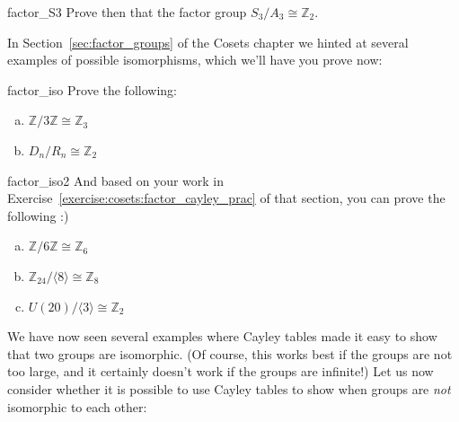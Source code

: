 
\begin{exercise}{factor_S3}
Prove then that the factor group $S_3/A_3 \cong {\mathbb Z}_2$.
\end{exercise}

In Section~\ref{sec:factor_groups} of the Cosets chapter we hinted at several examples of possible isomorphisms,  which we'll have you prove now:

\begin{exercise}{factor_iso}
Prove the following:
\begin{enumerate}[(a)]
\item
 ${\mathbb Z}/ 3 {\mathbb Z} \cong {\mathbb Z}_3$
\item
$D_n / R_n \cong {\mathbb Z}_2$
\end{enumerate}
\end{exercise}

\begin{exercise}{factor_iso2}
And based on your work in Exercise~\ref{exercise:cosets:factor_cayley_prac} of that section, you can prove the following :)
\begin{enumerate}[(a)]
\item
 ${\mathbb Z}/ 6 {\mathbb Z} \cong {\mathbb Z}_6 $

\item
 ${\mathbb Z}_{24} / \langle 8 \rangle \cong {\mathbb Z}_8 $ 

\item
$U(20) / \langle 3 \rangle \cong  {\mathbb Z}_2 $

\end{enumerate}
\end{exercise}

 


We have now seen several examples where  Cayley tables made it easy to show that two groups are isomorphic. (Of course, this works best if the groups are not too large, and it certainly doesn't work if the groups are infinite!)  Let us now consider whether it is possible to use Cayley tables to show when groups are \emph{not} isomorphic to each other: 

